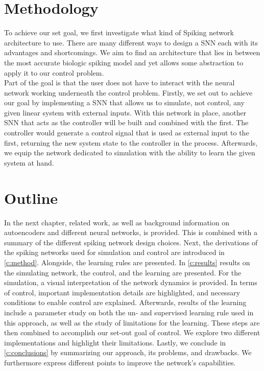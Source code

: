 \section{Methodology}
To achieve our set goal, we first investigate what kind of Spiking network architecture to use. There are many different ways to design a \ac{SNN} each with its advantages and shortcomings. We aim to find an architecture that lies in between the most accurate biologic spiking model and yet allows some abstraction to apply it to our control problem.\\
Part of the goal is that the user does not have to interact with the neural network working underneath the control problem.
Firstly, we set out to achieve our goal by implementing a \ac{SNN} that allows us to simulate, not control, any given linear system with external inputs. With this network in place, another \ac{SNN} that acts as the controller will be built and combined with the first. The controller would generate a control signal that is used as external input to the first, returning the new system state to the controller in the process. Afterwards, we equip the network dedicated to simulation with the ability to learn the given system at hand.


\section{Outline}
In the next chapter, related work, as well as background information on autoencoders and different neural networks, is provided. This is combined with a summary of the different spiking network design choices. Next, the derivations of the spiking networks used for simulation and control are introduced in \cref{c:method}. Alongside, the learning rules are presented. In \cref{c:results} results on the simulating network, the control, and the learning are presented. For the simulation, a visual interpretation of the network dynamics is provided. In terms of control, important implementation details are highlighted, and necessary conditions to enable control are explained. Afterwards, results of the learning include a parameter study on both the un- and supervised learning rule used in this approach, as well as the study of limitations for the learning. These steps are then combined to accomplish our set-out goal of control. We explore two different implementations and highlight their limitations. Lastly, we conclude in \cref{c:conclusions} by summarizing our approach, its problems, and drawbacks. We furthermore express different points to improve the network's capabilities.
